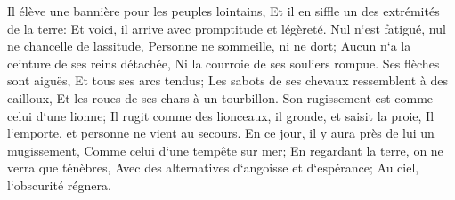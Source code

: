 \verse Il élève une bannière pour les peuples lointains, Et il en siffle un des extrémités de la terre: Et voici, il arrive avec promptitude et légèreté. 
\verse Nul n`est fatigué, nul ne chancelle de lassitude, Personne ne sommeille, ni ne dort; Aucun n`a la ceinture de ses reins détachée, Ni la courroie de ses souliers rompue. 
\verse Ses flèches sont aiguës, Et tous ses arcs tendus; Les sabots de ses chevaux ressemblent à des cailloux, Et les roues de ses chars à un tourbillon. 
\verse Son rugissement est comme celui d`une lionne; Il rugit comme des lionceaux, il gronde, et saisit la proie, Il l`emporte, et personne ne vient au secours. 
\verse En ce jour, il y aura près de lui un mugissement, Comme celui d`une tempête sur mer; En regardant la terre, on ne verra que ténèbres, Avec des alternatives d`angoisse et d`espérance; Au ciel, l`obscurité régnera. 


